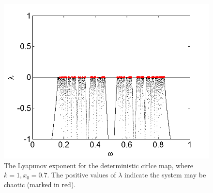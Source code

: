 \begin{figure}[!h]
\caption[Lyapunov exponent in the deterministic circle map]{The
  Lyapunov exponent for the deterministic
  cirlce map, where $k=1,x_0=0.7$. The positive values of $\lambda$ indicate the system may be chaotic (marked in red).}\label{fig:detcirclyap}
	\begin{center}
		\includegraphics[scale=0.65]{figs/det_circ_lyap.png}
	\end{center}
\end{figure} 





